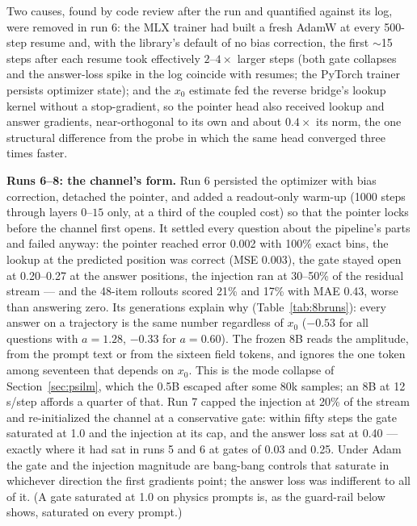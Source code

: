\documentclass[11pt]{article}
\begin{document}
Two causes, found by code review after the run and quantified against its log, were removed in run 6: the MLX trainer had built a fresh AdamW at every 500-step resume and, with the library's default of no bias correction, the first $\sim$15 steps after each resume took effectively $2$--$4\times$ larger steps (both gate collapses and the answer-loss spike in the log coincide with resumes; the PyTorch trainer persists optimizer state); and the $x_0$ estimate fed the reverse bridge's lookup kernel without a stop-gradient, so the pointer head also received lookup and answer gradients, near-orthogonal to its own and about $0.4\times$ its norm, the one structural difference from the probe in which the same head converged three times faster.

\textbf{Runs 6--8: the channel's form.} Run 6 persisted the optimizer with bias correction, detached the pointer, and added a readout-only warm-up (1000 steps through layers $0$--$15$ only, at a third of the coupled cost) so that the pointer locks before the channel first opens. It settled every question about the pipeline's parts and failed anyway: the pointer reached error 0.002 with 100\% exact bins, the lookup at the predicted position was correct (MSE 0.003), the gate stayed open at 0.20--0.27 at the answer positions, the injection ran at 30--50\% of the residual stream --- and the 48-item rollouts scored 21\% and 17\% with MAE 0.43, worse than answering zero. Its generations explain why (Table~\ref{tab:8bruns}): every answer on a trajectory is the same number regardless of $x_0$ ($-0.53$ for all questions with $a{=}1.28$, $-0.33$ for $a{=}0.60$). The frozen 8B reads the amplitude, from the prompt text or from the sixteen field tokens, and ignores the one token among seventeen that depends on $x_0$. This is the mode collapse of Section~\ref{sec:psilm}, which the 0.5B escaped after some 80k samples; an 8B at 12\,s/step affords a quarter of that. Run 7 capped the injection at 20\% of the stream and re-initialized the channel at a conservative gate: within fifty steps the gate saturated at 1.0 and the injection at its cap, and the answer loss sat at 0.40 --- exactly where it had sat in runs 5 and 6 at gates of 0.03 and 0.25. Under Adam the gate and the injection magnitude are bang-bang controls that saturate in whichever direction the first gradients point; the answer loss was indifferent to all of it. (A gate saturated at 1.0 on physics prompts is, as the guard-rail below shows, saturated on every prompt.)
\end{document}

